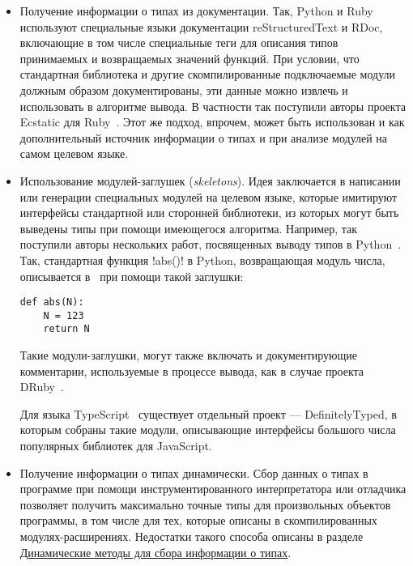\begin{itemize}
    \item{%
        Получение информации о типах из документации.  Так, Python и Ruby
        используют специальные языки документации reStructuredText и RDoc,
        включающие в том числе специальные теги для описания типов принимаемых и
        возвращаемых значений функций. При условии, что стандартная библиотека и
        другие скомпилированные подключаемые модули должным образом
        документированы, эти данные можно извлечь и использовать в алгоритме
        вывода.  В частности так поступили авторы проекта Ecstatic для
        Ruby~\cite{Madsen2007}.  Этот же подход, впрочем, может быть использован
        и как дополнительный источник информации о типах и при анализе модулей
        на самом целевом языке.
      }
    \item{%
        Использование модулей-заглушек (\emph{skeletons}). Идея заключается в
        написании или генерации специальных модулей на целевом языке, которые
        имитируют интерфейсы стандартной или сторонней библиотеки,
        из которых могут быть выведены типы при помощи имеющегося алгоритма.
        Например, так поступили авторы нескольких работ, посвященных
        выводу типов в Python~\cite{Aycock2000,Salib2004}.  Так,
        стандартная функция !abs()! в Python, возвращающая модуль числа,
        описывается в~\cite{Aycock2000} при помощи такой заглушки:

        \begin{lstlisting}
def abs(N):
    N = 123
    return N
        \end{lstlisting}

        Такие модули-заглушки, могут также включать и документирующие
        комментарии, используемые в процессе вывода, как в случае
        проекта DRuby~\cite{Furr2009}.
        
        Для языка TypeScript~\cite{TypeScript} существует отдельный проект ---
        DefinitelyTyped, в которым собраны такие модули, описывающие интерфейсы
        большого числа популярных библиотек для JavaScript.
      }
      \item{%
          Получение информации о типах динамически. Сбор данных о типах в
          программе при помощи инструментированного интерпретатора или отладчика
          позволяет получить максимально точные типы для произвольных объектов
          программы, в том числе для тех, которые описаны в скомпилированных
          модулях-расширениях. Недостатки такого способа описаны в разделе
          \hyperref[sec:dynamic-checks]{Динамические методы для сбора информации
          о типах}.
      }

\end{itemize}

